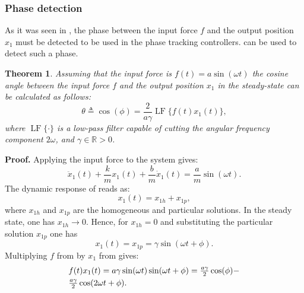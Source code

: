 \documentclass[preprint,12pt]{elsarticle}
\DeclareMathOperator{\LF}{LF}
\newtheorem{theorem}{Theorem}
\begin{document}
\subsubsection{Phase detection} \label{S_phase_detection}

As it was seen in , the phase between the input force $f$ and the output position $x_1$ must be detected to be used in the phase tracking controllers.  can be used to detect such a phase.
\begin{theorem} \label{Lemma_phase_detection}
Assuming that the input force is $f(t)=a\sin(\omega t)$ the cosine angle between the input force $f$ and the output position $x_1$ in the steady-state can be calculated as follows:
\begin{equation}
\theta\triangleq \cos(\phi) = \frac{2} {a\gamma}\LF \{f(t)x_1(t) \} ,
\label{E_phase_calculated}
\end{equation}
where $\LF\{\cdot\}$ is a low-pass filter capable of cutting the angular frequency component $2\omega$, and $\gamma \in \mathbb{R}>0$.
\end{theorem}
\noindent \textbf{Proof.}
Applying the input force  to the system  gives:
\begin{equation}
\ddot{x}_1(t)+\frac{k}{m}x_1(t)+\frac{b}{m} \dot{x}_1(t) =\frac{a}{m}\sin(\omega t) .
\label{E_plant_closed_loop}
\end{equation}
The dynamic response of  reads as:
\begin{equation}
x_1(t)=x_{1h}+x_{1p},
\end{equation}
where $x_{1h}$ and $x_{1p}$ are the homogeneous and particular solutions. In the steady state, one has $x_{1h} \rightarrow 0$. Hence, for $x_{1h}=0$ and substituting the particular solution $x_{1p}$ one has 
\begin{equation}
x_1(t)=x_{1p}=\gamma\sin(\omega t+\phi).
\label{E_x_1_steady}
\end{equation}
Multiplying $f$ from  by $x_1$ from  gives:
\begin{equation}
\begin{array}{l}
f(t)x_1(t)=a\gamma\sin(\omega t)\sin(\omega t+\phi)=\frac{a\gamma}{2}\cos(\phi)- \vspace{0.1cm} \\ 
\frac{a\gamma}{2}\cos(2\omega t +\phi) .
\end{array}
\label{E_multiple_avant}
\end{equation}
\end{document}
